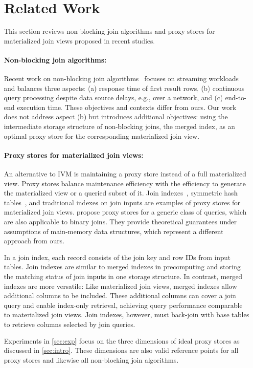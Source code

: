 \section{Related Work}
\label{sec:prior}

This section reviews non-blocking join algorithms and proxy stores for materialized join views proposed in recent studies.

\paragraph{Non-blocking join algorithms:}

Recent work on non-blocking join algorithms~\cite{Dittrich2002PMJ, Chen2010prjoin, Urhan2000XJoinAR, mokbel2004hash} focuses on streaming workloads and balances three aspects: (a) response time of first result rows, (b) continuous query processing despite data source delays, e.g., over a network, and (c) end-to-end execution time.
These objectives and contexts differ from ours.
Our work does not address aspect (b) but introduces additional objectives: using the intermediate storage structure of non-blocking joins, the merged index, as an optimal proxy store for the corresponding materialized join view.

\paragraph{Proxy stores for materialized join views:}

An alternative to IVM is maintaining a proxy store instead of a full materialized view.
Proxy stores balance maintenance efficiency with the efficiency to generate the materialized view or a queried subset of it.
Join indexes~\cite{oneil1995joinindex,valduriez87joinindex}, symmetric hash tables~\cite{wilschut1991shj, hong1993shj, Urhan2000XJoinAR, lawrence2005early}, and traditional indexes on join inputs are examples of proxy stores for materialized join views.
 propose proxy stores for a generic class of queries, which are also applicable to binary joins.
They provide theoretical guarantees under assumptions of main-memory data structures, which represent a different approach from ours.

In a join index, each record consists of the join key and row IDs from input tables.
Join indexes are similar to merged indexes in precomputing and storing the matching status of join inputs in one storage structure.
In contrast, merged indexes are more versatile:
Like materialized join views, merged indexes allow additional columns to be included.
These additional columns can cover a join query and enable index-only retrieval, achieving query performance comparable to materialized join views.
Join indexes, however, must back-join with base tables to retrieve columns selected by join queries.

Experiments in \cref{sec:exp} focus on the three dimensions of ideal proxy stores as discussed in \cref{sec:intro}.
These dimensions are also valid reference points for all proxy stores and likewise all non-blocking join algorithms.